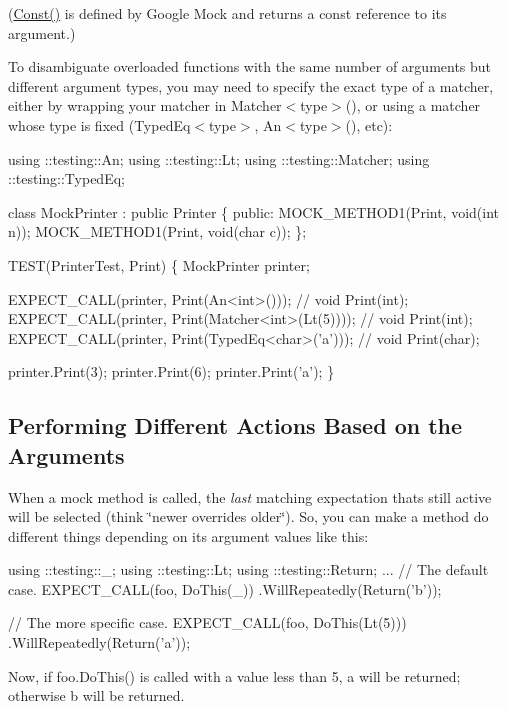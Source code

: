 ({\ttfamily \hyperlink{namespacetesting_a945ac56c5508a3c9c032bbe8aae8dcfa}{Const()}} is defined by Google Mock and returns a {\ttfamily const} reference to its argument.)

To disambiguate overloaded functions with the same number of arguments but different argument types, you may need to specify the exact type of a matcher, either by wrapping your matcher in {\ttfamily Matcher$<$type$>$()}, or using a matcher whose type is fixed ({\ttfamily Typed\+Eq$<$type$>$}, {\ttfamily An$<$type$>$()}, etc)\+:


\begin{DoxyCode}
using ::testing::An;
using ::testing::Lt;
using ::testing::Matcher;
using ::testing::TypedEq;

class MockPrinter : public Printer \{
 public:
  MOCK\_METHOD1(Print, void(int n));
  MOCK\_METHOD1(Print, void(char c));
\};

TEST(PrinterTest, Print) \{
  MockPrinter printer;

  EXPECT\_CALL(printer, Print(An<int>()));            // void Print(int);
  EXPECT\_CALL(printer, Print(Matcher<int>(Lt(5))));  // void Print(int);
  EXPECT\_CALL(printer, Print(TypedEq<char>('a')));   // void Print(char);

  printer.Print(3);
  printer.Print(6);
  printer.Print('a');
\}
\end{DoxyCode}


\subsection*{Performing Different Actions Based on the Arguments}

When a mock method is called, the {\itshape last} matching expectation that\textquotesingle{}s still active will be selected (think \char`\"{}newer overrides older\char`\"{}). So, you can make a method do different things depending on its argument values like this\+:


\begin{DoxyCode}
using ::testing::\_;
using ::testing::Lt;
using ::testing::Return;
...
  // The default case.
  EXPECT\_CALL(foo, DoThis(\_))
      .WillRepeatedly(Return('b'));

  // The more specific case.
  EXPECT\_CALL(foo, DoThis(Lt(5)))
      .WillRepeatedly(Return('a'));
\end{DoxyCode}


Now, if {\ttfamily foo.\+Do\+This()} is called with a value less than 5, {\ttfamily \textquotesingle{}a\textquotesingle{}} will be returned; otherwise {\ttfamily \textquotesingle{}b\textquotesingle{}} will be returned.

